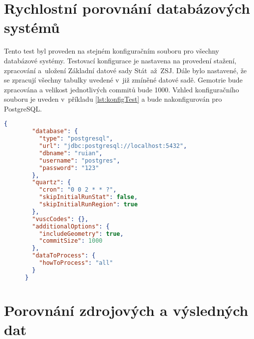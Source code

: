 \section{Rychlostní porovnání databázových systémů}
Tento test byl proveden na stejném konfiguračním souboru pro všechny databázové systémy.
Testovací konfigurace je nastavena na provedení stažení, zpracování a~uložení Základní datové sady Stát~až~ZSJ. 
Dále bylo nastavené, že se zpracují všechny tabulky uvedené v~již zmíněné datové sadě.
Gemotrie bude zpracována a velikost jednotlivých commitů bude 1000.
Vzhled konfiguračního souboru je uveden v~příkladu \ref{lst:konfigTest} a bude nakonfigurován pro PostgreSQL.

\small
\begin{lstlisting}[language=json, caption={Konfigurační soubor pro test rychlosti}, label={lst:konfigTest}]
    {
        "database": {
          "type": "postgresql",
          "url": "jdbc:postgresql://localhost:5432",
          "dbname": "ruian",
          "username": "postgres",
          "password": "123"
        },
        "quartz": {
          "cron": "0 0 2 * * ?",
          "skipInitialRunStat": false,
          "skipInitialRunRegion": true
        },
        "vuscCodes": {},
        "additionalOptions": {
          "includeGeometry": true,
          "commitSize": 1000
        },
        "dataToProcess": {
          "howToProcess": "all"
        }
      }    
\end{lstlisting}
\normalsize


\section{Porovnání zdrojových a výsledných dat}
